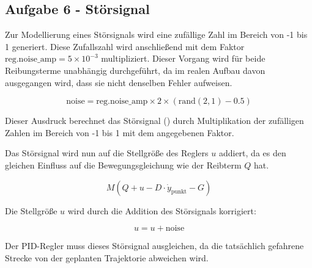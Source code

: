 \subsection*{Aufgabe 6 - Störsignal}

Zur Modellierung eines Störsignals wird eine zufällige Zahl im Bereich von -1 bis 1 generiert. Diese Zufallszahl wird anschließend mit dem Faktor \( \text{reg.noise\_amp} = 5 \times 10^{-3} \) multipliziert. Dieser Vorgang wird für beide Reibungsterme unabhängig durchgeführt, da im realen Aufbau davon ausgegangen wird, dass sie nicht denselben Fehler aufweisen.

\[
\text{noise} = \text{reg.noise\_amp} \times 2 \times (\text{rand}(2,1) - 0.5)
\]

Dieser Ausdruck berechnet das Störsignal () durch Multiplikation der zufälligen Zahlen im Bereich von -1 bis 1 mit dem angegebenen Faktor.


Das Störsignal wird nun auf die Stellgröße des Reglers \(u\) addiert, da es den gleichen Einfluss auf die Bewegungsgleichung wie der Reibterm \(Q\) hat.

\[ M(Q + u - D \cdot \dot{y}_{\text{punkt}} - G) \]

Die Stellgröße \(u\) wird durch die Addition des Störsignals korrigiert:

\[ u = u + \text{noise} \]

Der PID-Regler muss dieses Störsignal ausgleichen, da die tatsächlich gefahrene Strecke von der geplanten Trajektorie abweichen wird.
